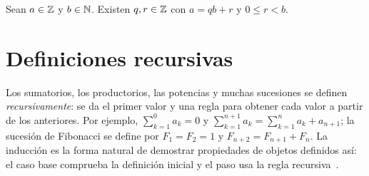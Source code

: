 \begin{proposicion}\label{prop:division-existencia}
Sean $a\in\mathbb{Z}$ y $b\in\mathbb{N}$. Existen $q,r\in\mathbb{Z}$ con $a=qb+r$ y $0\le r<b$.
\end{proposicion}

\section{Definiciones recursivas}

Los sumatorios, los productorios, las potencias y muchas sucesiones se definen \emph{recursivamente}: se da el primer valor y una regla para obtener cada valor a partir de los anteriores. Por ejemplo, $\sum_{k=1}^{0}a_k=0$ y $\sum_{k=1}^{n+1}a_k=\sum_{k=1}^{n}a_k+a_{n+1}$; la sucesión de Fibonacci se define por $F_1=F_2=1$ y $F_{n+2}=F_{n+1}+F_n$. La inducción es la forma natural de demostrar propiedades de objetos definidos así: el caso base comprueba la definición inicial y el paso usa la regla recursiva~\cite[§10.5]{hammack}.

\addtocounter{definicion}{1}%

\addtocounter{definicion}{1}%


